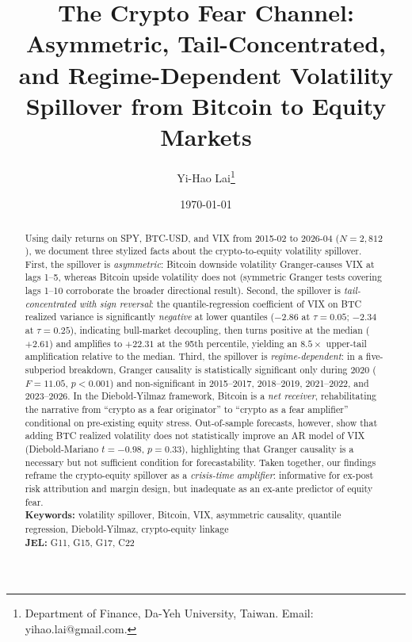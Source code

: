 \documentclass[11pt,a4paper]{article}
\title{The Crypto Fear Channel:\\ Asymmetric, Tail-Concentrated, and Regime-Dependent Volatility Spillover from Bitcoin to Equity Markets}
\author{Yi-Hao Lai\thanks{Department of Finance, Da-Yeh University, Taiwan. Email: yihao.lai@gmail.com.}}
\date{\today}
\begin{document}
\maketitle

\begin{abstract}
\noindent Using daily returns on SPY, BTC-USD, and VIX from 2015-02 to 2026-04 ($N = 2{,}812$), we document three stylized facts about the crypto-to-equity volatility spillover. First, the spillover is \emph{asymmetric}: Bitcoin downside volatility Granger-causes VIX at lags 1--5, whereas Bitcoin upside volatility does not (symmetric Granger tests covering lags 1--10 corroborate the broader directional result).%
 Second, the spillover is \emph{tail-concentrated with sign reversal}: the quantile-regression coefficient of VIX on BTC realized variance is significantly \emph{negative} at lower quantiles ($-2.86$ at $\tau = 0.05$; $-2.34$ at $\tau = 0.25$), indicating bull-market decoupling, then turns positive at the median ($+2.61$) and amplifies to $+22.31$ at the 95th percentile, yielding an $8.5\times$ upper-tail amplification relative to the median. Third, the spillover is \emph{regime-dependent}: in a five-subperiod breakdown, Granger causality is statistically significant only during 2020 ($F = 11.05$, $p < 0.001$) and non-significant in 2015--2017, 2018--2019, 2021--2022, and 2023--2026. In the Diebold-Yilmaz framework, Bitcoin is a \emph{net receiver}, rehabilitating the narrative from ``crypto as a fear originator'' to ``crypto as a fear amplifier'' conditional on pre-existing equity stress. Out-of-sample forecasts, however, show that adding BTC realized volatility does not statistically improve an AR model of VIX (Diebold-Mariano $t = -0.98$, $p = 0.33$), highlighting that Granger causality is a necessary but not sufficient condition for forecastability. Taken together, our findings reframe the crypto-equity spillover as a \emph{crisis-time amplifier}: informative for ex-post risk attribution and margin design, but inadequate as an ex-ante predictor of equity fear. \\

\noindent\textbf{Keywords:} volatility spillover, Bitcoin, VIX, asymmetric causality, quantile regression, Diebold-Yilmaz, crypto-equity linkage \\
\textbf{JEL:} G11, G15, G17, C22
\end{abstract}
\end{document}
